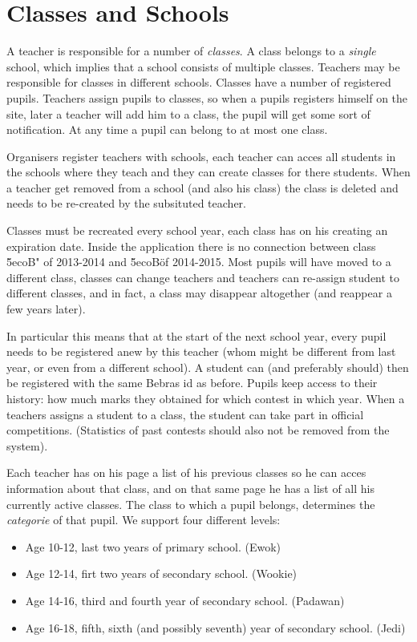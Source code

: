 
\section{Classes and Schools}

A teacher is responsible for a number of \emph{classes}. A class belongs to a \emph{single} school, which implies that a school consists of multiple classes. Teachers may be responsible for classes in different schools. Classes have a number of registered pupils. Teachers assign pupils to classes, so when a pupils registers himself on the site, later a teacher will add him to a class, the pupil will get some sort of notification. At any time a pupil can belong to at most one class. 

Organisers register teachers with schools, each teacher can acces all students in the schools where they teach and they can create classes for there students.
When a teacher get removed from a school (and also his class) the class is deleted and needs to be re-created by the subsituted teacher.

Classes must be recreated every school year, each class has on his creating an expiration date. Inside the application there is no connection between class \"5ecoB" of 2013-2014 and \"5ecoB\" of 2014-2015. Most pupils will have moved to a different class, classes can change teachers and teachers can re-assign student to different classes, and in fact, a class may disappear altogether (and reappear a few years later).

In particular this means that at the start of the next school year, every pupil needs to be registered anew by this teacher (whom might be different from last year, or even from a different school). A student can (and preferably should) then be registered with the same Bebras id as before. Pupils keep access to their history: how much marks they obtained for which contest in which year. 
When a teachers assigns a student to a class, the student can take part in official competitions.
(Statistics of past contests should also not be removed from the system).

Each teacher has on his page a list of his previous classes so he can acces information about that class, and on that same page he has a list of all his currently active classes. 
The class to which a pupil belongs, determines the \emph{categorie} of that pupil. We support four different levels:
\begin{itemize}
\item Age 10-12, last two years of primary school. (Ewok)
\item Age 12-14, firt two years of secondary school. (Wookie)
\item Age 14-16, third and fourth year of secondary school. (Padawan)
\item Age 16-18, fifth, sixth (and possibly seventh) year of secondary school. (Jedi)
\end{itemize}


